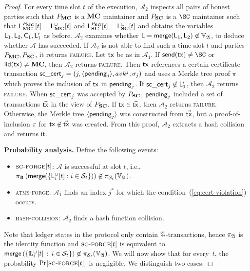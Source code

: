 \begin{proof}
  For every time slot $t$ of the execution, $\mathcal{A}_2$ inspects all pairs
  of honest parties such that $P_{\mathbf{MC}}$ is a $\mathbf{MC}$ maintainer and $P_{\mathbf{SC}}$ is
  a $\SC$ maintainer such that
  $\mathsf{L}_{\mathbf{MC}}^{P_{\mathbf{MC}}}[t] = \mathsf{L}_{\mathbf{MC}}^\cup[t]$ and
  $\mathsf{L}_{\mathbf{SC}}^{P_{\mathbf{SC}}}[t] = \mathsf{L}_{\mathbf{SC}}^\cup[t]$
  and obtains the variables $\mathsf{L}_1, \mathsf{L}_2, \mathsf{C}_1,
  \mathsf{L}'_1$ as before. $\mathcal{A}_2$ examines whether $\mathsf{L} =
  \mathsf{merge}(\mathsf{L}_1, \mathsf{L}_2) \not\in\mathbb{V}_{\mathfrak{A}}$, to deduce whether $\mathcal{A}$
  has succeeded. If $\mathcal{A}_2$ is not able to find such a time slot $t$ and
  parties $P_{\mathbf{MC}}, P_{\mathbf{SC}}$, it returns \textsc{failure}. Let $\mathsf{tx}$ be as in
  $\mathcal{A}_1$. If $\send(\tx) \neq \SC$ or $\mathsf{lid}(\mathsf{tx}) \neq \mathbf{MC}$, then
  $\mathcal{A}_2$ returns \textsc{failure}. Then $\mathsf{tx}$ references a certain
  certificate transaction $\mathsf{sc\_cert}_j = (j,\langle\mathsf{pending}_j\rangle, avk^j,\sigma_j)$ and
  uses a Merkle tree proof $\pi$ which proves the inclusion of $\mathsf{tx}$ in
  $\mathsf{pending}_j$. If $\mathsf{sc\_cert}_j \not\in \mathsf{L}'_1$,
  then $\mathcal{A}_2$ returns
  \textsc{failure}. When $\mathsf{sc\_cert}_j$ was accepted by $P_{\mathbf{SC}}$, $\mathsf{pending}_j$
  included a set of transactions $\vec{\mathsf{tx}}$ in the view of $P_{\mathbf{SC}}$. If $\mathsf{tx}
  \in \vec{\mathsf{tx}}$, then $\mathcal{A}_2$ returns \textsc{failure}. Otherwise, the
  Merkle tree $\langle\mathsf{pending}_j\rangle$ was constructed from $\vec{\mathsf{tx}}$, but a
  proof-of-inclusion $\pi$ for $\mathsf{tx} \not\in \vec{\mathsf{tx}}$ was created. From this
  proof, $\mathcal{A}_2$ extracts a hash collision and returns it.

  \bigskip
  \textbf{Probability analysis.}
  Define the following events:
  \begin{itemize}
    \item $\textsc{sc-forge}[t]$: $\mathcal{A}$ is successful at slot $t$, i.e.,
          $\pi_{\mathfrak{A}}\left(\mathsf{merge}(\{\mathsf{L}_i^{\cup}[t]: i \in \mathcal{S}_t\})\right) \not\in
          \pi_{\mathcal{S}_t}(\mathbb{V}_{\mathfrak{A}})$.
    \item \textsc{atms-forge}:  $\mathcal{A}_1$ finds an
          index $j^*$ for which the condition~(\ref{eq:cert-violation}) occurs.
    \item \textsc{hash-collision}:  $\mathcal{A}_2$ finds a
          hash function collision.
  \end{itemize}
  Note that ledger states in the protocol only contain $\mathfrak{A}$-transactions,
  hence
  $\pi_{\mathfrak{A}}$ is the identity function and
  $\textsc{sc-forge}[t]$ is equivalent to
  $
  \mathsf{merge}\left(
    \left\{ \mathbf{L}_i^{\cup}[t] \,:\, i\in\mathcal{S}_t \right\}
  \right)
  \not\in
  \pi_{\mathcal{S}_t}(\mathbb{V}_{\mathfrak{A}})
  $.
  We will now show that for every~$t$, the probability $\Pr[\textsc{sc-forge}[t]]$ is
  negligible.
  We distinguish two cases:


\end{proof}

